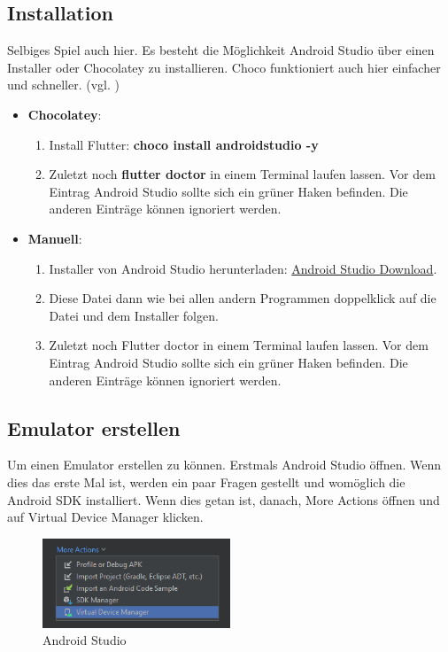 \subsection{Installation}
Selbiges Spiel auch hier. Es besteht die Möglichkeit Android Studio über einen Installer oder Chocolatey zu installieren. Choco funktioniert auch hier einfacher und schneller. (vgl. \cite{Android-Studio})
\begin{itemize}
    \item \textbf{Chocolatey}:
    \begin{enumerate}
        \item Install Flutter: \textbf{choco install androidstudio -y}
        \item Zuletzt noch \textbf{flutter doctor} in einem Terminal laufen lassen. Vor dem Eintrag Android Studio sollte sich ein grüner Haken befinden. Die anderen Einträge können ignoriert werden.
    \end{enumerate}
    
    \item \textbf{Manuell}:
    \begin{enumerate}
        \item Installer von Android Studio herunterladen: \href{https://redirector.gvt1.com/edgedl/android/studio/install/2022.1.1.20/android-studio-2022.1.1.20-windows.exe}{Android Studio Download}.
        \item Diese Datei dann wie bei allen andern Programmen doppelklick auf die Datei und dem Installer folgen.
        \item Zuletzt noch Flutter doctor in einem Terminal laufen lassen. Vor dem Eintrag Android Studio sollte sich ein grüner Haken befinden. Die anderen Einträge können ignoriert werden.
    \end{enumerate}
\end{itemize}

\newpage

\subsection{Emulator erstellen }
Um einen Emulator erstellen zu können. Erstmals Android Studio öffnen. Wenn dies das erste Mal ist, werden ein paar Fragen gestellt und womöglich die Android SDK installiert. Wenn dies getan ist, danach, More Actions öffnen und auf Virtual Device Manager klicken. 
\begin{figure}[!h]
\centering
\vspace{0.5cm}
\includegraphics[width=0.5\textwidth]{FLUTTER/images/ZB/android_studio.png}
\caption{Android Studio}
\end{figure}

